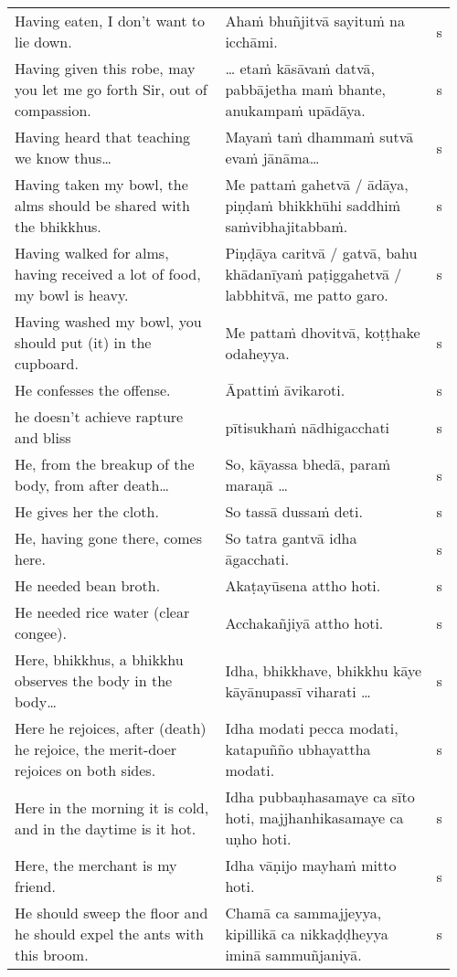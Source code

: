 \documentclass[a5paper]{memoir}
\begin{document}
\begin{longtable}{L{0.48\linewidth} L{0.48\linewidth} H}
Having eaten, I don't want to lie down. & Ahaṁ bhuñjitvā sayituṁ na icchāmi. & s\\[0pt]
Having given this robe, may you let me go forth Sir, out of compassion. & \ldots{} etaṁ kāsāvaṁ datvā, pabbājetha maṁ bhante, anukampaṁ upādāya. & s\\[0pt]
Having heard that teaching we know thus\ldots{} & Mayaṁ taṁ dhammaṁ sutvā evaṁ jānāma\ldots{} & s\\[0pt]
Having taken my bowl, the alms should be shared with the bhikkhus. & Me pattaṁ gahetvā / ādāya, piṇḍaṁ bhikkhūhi saddhiṁ saṁvibhajitabbaṁ. & s\\[0pt]
Having walked for alms, having received a lot of food, my bowl is heavy. & Piṇḍāya caritvā / gatvā, bahu khādanīyaṁ paṭiggahetvā / labbhitvā, me patto garo. & s\\[0pt]
Having washed my bowl, you should put (it) in the cupboard. & Me pattaṁ dhovitvā, koṭṭhake odaheyya. & s\\[0pt]
He confesses the offense. & Āpattiṁ āvikaroti. & s\\[0pt]
he doesn't achieve rapture and bliss & pītisukhaṁ nādhigacchati & s\\[0pt]
He, from the breakup of the body, from after death\ldots{} & So, kāyassa bhedā, paraṁ maraṇā \ldots{} & s\\[0pt]
He gives her the cloth. & So tassā dussaṁ deti. & s\\[0pt]
He, having gone there, comes here. & So tatra gantvā idha āgacchati. & s\\[0pt]
He needed bean broth. & Akaṭayūsena attho hoti. & s\\[0pt]
He needed rice water (clear congee). & Acchakañjiyā attho hoti. & s\\[0pt]
Here, bhikkhus, a bhikkhu observes the body in the body\ldots{} & Idha, bhikkhave, bhikkhu kāye kāyānupassī viharati \ldots{} & s\\[0pt]
Here he rejoices, after (death) he rejoice, the merit-doer rejoices on both sides. & Idha modati pecca modati, katapuñño ubhayattha modati. & s\\[0pt]
Here in the morning it is cold, and in the daytime is it hot. & Idha pubbaṇhasamaye ca sīto hoti, majjhanhikasamaye ca uṇho hoti. & s\\[0pt]
Here, the merchant is my friend. & Idha vāṇijo mayhaṁ mitto hoti. & s\\[0pt]
He should sweep the floor and he should expel the ants with this broom. & Chamā ca sammajjeyya, kipillikā ca nikkaḍḍheyya iminā sammuñjaniyā. & s\\[0pt]

\end{longtable}
\end{document}
